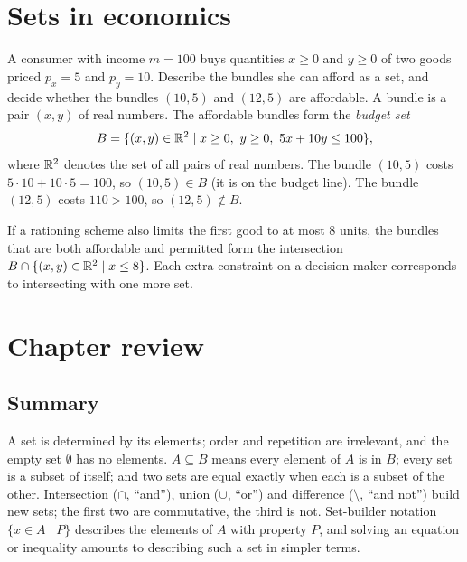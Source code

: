 \section{Sets in economics}\label{sec:sets-econ}

\begin{example}
A consumer with income $m=100$ buys quantities $x\ge0$ and $y\ge0$ of two goods priced $p_x=5$ and
$p_y=10$. Describe the bundles she can afford as a set, and decide whether the bundles $(10,5)$ and
$(12,5)$ are affordable.
\solution
A bundle is a pair $(x,y)$ of real numbers. The affordable bundles form the \emph{budget set}
\[
B=\{(x,y)\in\R^2\mid x\ge0,\ y\ge0,\ 5x+10y\le100\},
\]
where $\mathbb{R}^2$ denotes the set of all pairs of real numbers. The bundle $(10,5)$ costs $5\cdot10+10\cdot5=100$,
so $(10,5)\in B$ (it is on the budget line). The bundle $(12,5)$ costs $110>100$, so $(12,5)\notin B$.

If a rationing scheme also limits the first good to at most $8$ units, the bundles that are both
affordable and permitted form the intersection $B\cap\{(x,y)\in\mathbb{R}^2\mid x\le 8\}$. Each extra constraint
on a decision-maker corresponds to intersecting with one more set.
\end{example}

\section{Chapter review}
\subsection*{Summary}
A set is determined by its elements; order and repetition are irrelevant, and the empty set $\emptyset$ has
no elements. $A\subseteq B$ means every element of $A$ is in $B$; every set is a subset of itself; and two
sets are equal exactly when each is a subset of the other. Intersection ($\cap$, ``and''), union ($\cup$,
``or'') and difference ($\setminus$, ``and not'') build new sets; the first two are commutative, the third is
not. Set-builder notation $\{x\in A\mid P\}$ describes the elements of $A$ with property $P$, and solving an
equation or inequality amounts to describing such a set in simpler terms.

